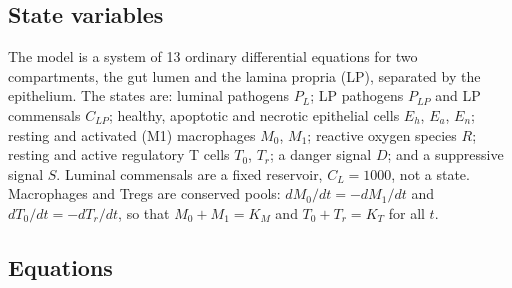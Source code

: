 \documentclass[11pt]{article}
\begin{document}
\subsection{State variables}

The model is a system of 13 ordinary differential equations for two compartments,
the gut lumen and the lamina propria (LP), separated by the epithelium. The states
are: luminal pathogens $P_L$; LP pathogens $P_{LP}$ and LP commensals $C_{LP}$;
healthy, apoptotic and necrotic epithelial cells $E_h$, $E_a$, $E_n$; resting and
activated (M1) macrophages $M_0$, $M_1$; reactive oxygen species $R$; resting and
active regulatory T cells $T_0$, $T_r$; a danger signal $D$; and a suppressive
signal $S$. Luminal commensals are a fixed reservoir, $C_L = 1000$, not a state.
Macrophages and Tregs are conserved pools: $dM_0/dt = -dM_1/dt$ and
$dT_0/dt = -dT_r/dt$, so that $M_0 + M_1 = K_M$ and $T_0 + T_r = K_T$ for all $t$.

\subsection{Equations}
\end{document}

